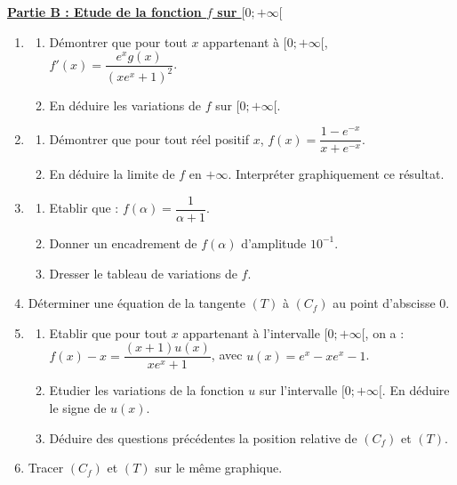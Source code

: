 \documentclass[12pt,a4paper]{article}
\begin{document}
\noindent \underline{\textbf{Partie B : Etude de la fonction $f$ sur $[0; +\infty[$}} \\
\begin{enumerate}
    \item \begin{enumerate}
        \item Démontrer que pour tout $x$ appartenant à $[0; +\infty[$, $f'(x) = \dfrac{e^x g(x)}{(xe^x + 1)^2}$.
        \item En déduire les variations de $f$ sur $[0; +\infty[$.
    \end{enumerate}
    \item \begin{enumerate}
        \item Démontrer que pour tout réel positif $x$, $f(x) = \dfrac{1 - e^{-x}}{x + e^{-x}}$.
        \item En déduire la limite de $f$ en $+\infty$. Interpréter graphiquement ce résultat.
    \end{enumerate}
    \item \begin{enumerate}
        \item Etablir que : $f(\alpha) = \dfrac{1}{\alpha + 1}$.
        \item Donner un encadrement de $f(\alpha)$ d'amplitude $10^{-1}$.
        \item Dresser le tableau de variations de $f$.
    \end{enumerate}
    \item Déterminer une équation de la tangente $(T)$ à $(C_f)$ au point d'abscisse 0.
    \item \begin{enumerate}
        \item Etablir que pour tout $x$ appartenant à l'intervalle $[0; +\infty[$, on a : \\
        $f(x) - x = \dfrac{(x+1)u(x)}{xe^x + 1}$, avec $u(x) = e^x - xe^x - 1$.
        \item Etudier les variations de la fonction $u$ sur l'intervalle $[0; +\infty[$. En déduire le signe de $u(x)$.
        \item Déduire des questions précédentes la position relative de $(C_f)$ et $(T)$.
    \end{enumerate}
    \item Tracer $(C_f)$ et $(T)$ sur le même graphique.
\end{enumerate}

\vspace{0.5cm}
\end{document}
